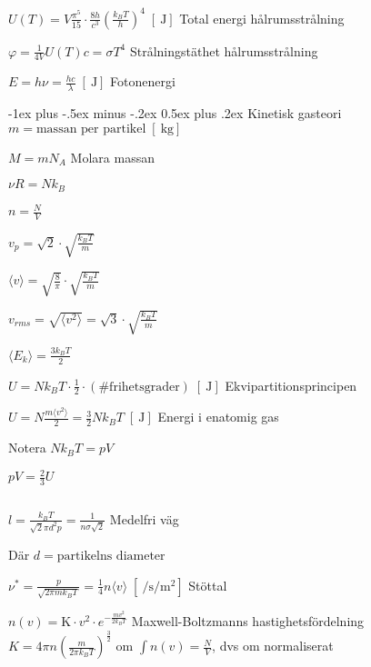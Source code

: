 \documentclass[10pt,landscape]{article}
\makeatletter
\newcommand{\unit}[1]{
\;[\SI{}{#1}]
}
\renewcommand{\section}{\@startsection{section}{1}{0mm}%
                                {-1ex plus -.5ex minus -.2ex}%
                                {0.5ex plus .2ex}%
                                {\normalfont\large\bfseries}
                                }
\makeatother
\begin{document}
\begin{multicols}{3}
$\displaystyle U(T) = V \frac{\pi^5}{15} \cdot \frac{8h}{c^3}\left(\frac{k_BT}{h}\right)^4 \unit{\joule}$ \hfill Total energi hålrumsstrålning

$\varphi = \frac{1}{4V} U(T)c = \sigma T^4$ \hfill Strålningstäthet hålrumsstrålning

$E = h\nu = \frac{hc}{\lambda} \unit{\joule}$ \hfill Fotonenergi

\section{Kinetisk gasteori}
$m = \text{massan per partikel} \unit{\kilogram}$

$M = mN_A$ \hfill Molara massan

$\nu R = Nk_B$

$ n = \frac{N}{V}$

$v_p = \sqrt{2} \cdot \sqrt{\frac{k_B T}{m}}$

$\langle v \rangle = \sqrt{\frac{8}{\pi}} \cdot \sqrt{\frac{k_BT}{m}}$

$v_{rms} = \sqrt{\langle v^2 \rangle} = \sqrt{3} \cdot \sqrt{\frac{k_BT}{m}}$

$\langle E_k \rangle = \frac{3k_BT}{2}$

$U = Nk_BT \cdot \frac{1}{2} \cdot (\# \text{frihetsgrader}) \unit{\joule}$ \hfill Ekvipartitionsprincipen

$U = N \frac{m \langle v^2 \rangle}{2} = \frac{3}{2} Nk_BT \unit{\joule}$ \hfill Energi i enatomig gas

Notera $Nk_BT = pV$

$pV = \frac{2}{3}U$

$$$$

$l = \frac{k_BT}{\sqrt{2}\pi d^2 p} = \frac{1}{n \sigma \sqrt{2}}$  \hfill Medelfri väg

Där $d = \text{partikelns diameter}$


$\nu^* = \frac{p}{\sqrt{2 \pi mk_BT}} = \frac{1}{4}n \langle v \rangle \unit{\per\second \per\square\meter}$ \hfill Stöttal

$\displaystyle n(v) = \text{K} \cdot v^2 \cdot e^{-\frac{mv^2}{2k_BT}}$ \hfill Maxwell-Boltzmanns hastighetsfördelning
$K = 4\pi n \left(\frac{m}{2\pi k_B T} \right)^\frac{3}{2}$ \hfill om $\int n(v) = \frac{N}{V}$, dvs om normaliserat


\end{multicols}
\end{document}
